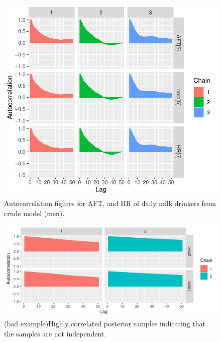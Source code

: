 \documentclass[]{tufte-handout}
\begin{document}
\begin{figure}
\includegraphics{HandOutEngBayes_files/figure-latex/unnamed-chunk-7-1} \caption[Autocorrelation figures for AFT, and HR of daily milk drinkers from crude model (men)]{Autocorrelation figures for AFT, and HR of daily milk drinkers from crude model (men).}\label{fig:unnamed-chunk-7}
\end{figure}

\begin{figure}

{\centering \includegraphics[width=0.9\linewidth]{fig/badautocorrelation} 

}

\caption[(bad example)Highly correlated posterior samples indicating that the samples are not independent]{(bad example)Highly correlated posterior samples indicating that the samples are not independent.}\label{fig:badauto}
\end{figure}
\end{document}

